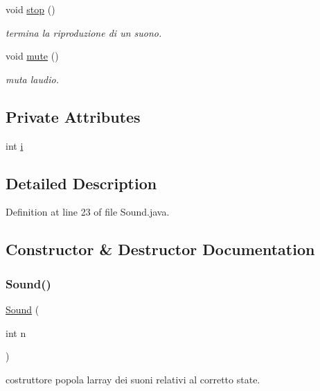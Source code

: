 \begin{DoxyCompactItemize}
void \hyperlink{classprogetto_1_1_sound_a8c528baf37154d347366083f0f816846}{stop} ()
\begin{DoxyCompactList}\small\item\em termina la riproduzione di un suono. \end{DoxyCompactList}\item 
void \hyperlink{classprogetto_1_1_sound_a4641ac073645140bf1f9577c2587fe3b}{mute} ()
\begin{DoxyCompactList}\small\item\em muta l\textquotesingle{}audio. \end{DoxyCompactList}\end{DoxyCompactItemize}
\subsection*{Private Attributes}
\begin{DoxyCompactItemize}
\item 
int \hyperlink{classprogetto_1_1_sound_acb559820d9ca11295b4500f179ef6392}{i}
\end{DoxyCompactItemize}


\subsection{Detailed Description}


Definition at line 23 of file Sound.\+java.



\subsection{Constructor \& Destructor Documentation}
\mbox{\label{classprogetto_1_1_sound_aed1261999531d2ad6a7ee45254d5d192}} 
\subsubsection{\texorpdfstring{Sound()}{Sound()}}
{\footnotesize\ttfamily \hyperlink{classprogetto_1_1_sound}{Sound} (\begin{DoxyParamCaption}\item[{int}]{n }\end{DoxyParamCaption})}



costruttore popola l\textquotesingle{}array dei suoni relativi al corretto state. 



